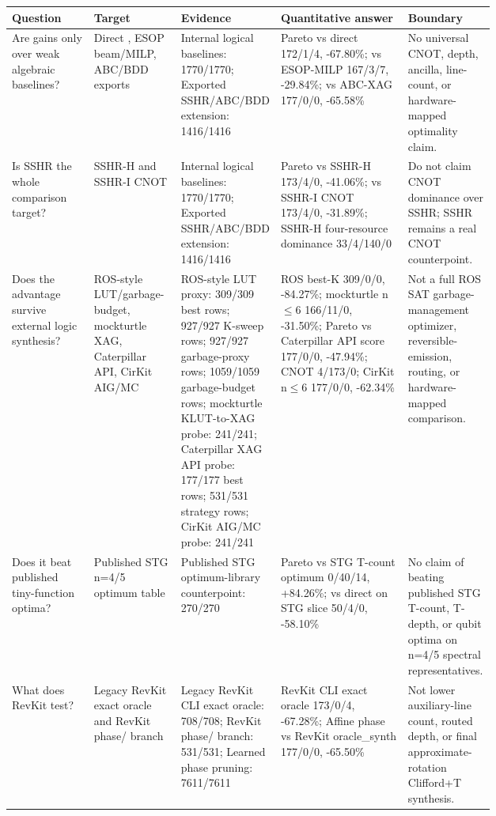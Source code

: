 \begin{tabularx}{\linewidth}{>{\raggedright\arraybackslash}p{0.17\linewidth}>{\raggedright\arraybackslash}p{0.18\linewidth}>{\raggedright\arraybackslash}p{0.18\linewidth}>{\raggedright\arraybackslash}X>{\raggedright\arraybackslash}p{0.18\linewidth}}
\toprule
Question & Target & Evidence & Quantitative answer & Boundary \\
\midrule
Are gains only over weak algebraic baselines? & Direct \anf{}, ESOP beam/MILP, ABC/BDD exports & Internal logical baselines: 1770/1770; Exported SSHR/ABC/BDD extension: 1416/1416 & Pareto vs direct \anf{} 172/1/4, -67.80\%; vs ESOP-MILP 167/3/7, -29.84\%; vs ABC-XAG 177/0/0, -65.58\% & No universal CNOT, depth, ancilla, line-count, or hardware-mapped optimality claim. \\
Is SSHR the whole comparison target? & SSHR-H and SSHR-I CNOT & Internal logical baselines: 1770/1770; Exported SSHR/ABC/BDD extension: 1416/1416 & Pareto vs SSHR-H 173/4/0, -41.06\%; vs SSHR-I CNOT 173/4/0, -31.89\%; SSHR-H four-resource dominance 33/4/140/0 & Do not claim CNOT dominance over SSHR; SSHR remains a real CNOT counterpoint. \\
Does the advantage survive external logic synthesis? & ROS-style LUT/garbage-budget, mockturtle XAG, Caterpillar API, CirKit AIG/MC & ROS-style LUT proxy: 309/309 best rows; 927/927 K-sweep rows; 927/927 garbage-proxy rows; 1059/1059 garbage-budget rows; mockturtle KLUT-to-XAG probe: 241/241; Caterpillar XAG API probe: 177/177 best rows; 531/531 strategy rows; CirKit AIG/MC probe: 241/241 & ROS best-K 309/0/0, -84.27\%; mockturtle n$\leq$6 166/11/0, -31.50\%; Pareto vs Caterpillar API score 177/0/0, -47.94\%; CNOT 4/173/0; CirKit n$\leq$6 177/0/0, -62.34\% & Not a full ROS SAT garbage-management optimizer, reversible-emission, routing, or hardware-mapped comparison. \\
Does it beat published tiny-function optima? & Published STG n=4/5 optimum table & Published STG optimum-library counterpoint: 270/270 & Pareto vs STG T-count optimum 0/40/14, +84.26\%; vs direct \anf{} on STG slice 50/4/0, -58.10\% & No claim of beating published STG T-count, T-depth, or qubit optima on n=4/5 spectral representatives. \\
What does RevKit test? & Legacy RevKit exact oracle and RevKit phase/\rz{} branch & Legacy RevKit CLI exact oracle: 708/708; RevKit phase/\rz{} branch: 531/531; Learned phase pruning: 7611/7611 & RevKit CLI exact oracle 173/0/4, -67.28\%; Affine phase vs RevKit oracle\_synth 177/0/0, -65.50\% & Not lower auxiliary-line count, routed depth, or final approximate-rotation Clifford+T synthesis. \\

\end{tabularx}
